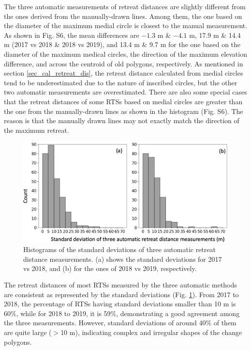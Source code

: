 \documentclass[authoryear,preprint,review,12pt]{elsarticle}
\begin{document}
The three automatic measurements of retreat distances are slightly different from the ones derived from the manually-drawn lines. Among them, the one based on the diameter of the maximum medial circle is closest to the manual measurement. 
As shown in Fig. S6, the mean differences are $-1.3$ m \& $-4.1$ m, 17.9 m \& 14.4 m (2017 vs 2018 \& 2018 vs 2019), and 13.4 m \& 9.7 m for the one based on the diameter of the maximum medical circles, the direction of the maximum elevation difference, and across the centroid of old polygons, respectively. 
As mentioned in section \ref{sec_cal_retreat_dis}, the retreat distance calculated from medial circles tend to be underestimated due to the nature of inscribed circles, but the other two automatic measurements are overestimated. 
There are also some special cases that the retreat distances of some RTSs based on medial circles are greater than the one from the manually-drawn lines as shown in the histogram (Fig. S6).
The reason is that the manually drawn lines may not exactly match the direction of the maximum retreat.  

\begin{figure} 
	\centering
	\includegraphics[width=14cm]{figs/standard_deviation_v2_trim.jpg}
	\caption{Histograms of the standard deviations of three automatic retreat distance measurements. (a) shows the standard deviations for 2017 vs 2018, and (b) for the ones of 2018 vs 2019, respectively.}
	\label{fig_re_dis_standard_var}
\end{figure}

The retreat distances of most RTSs measured by the three automatic methods are consistent as represented by the standard deviations (Fig. \ref{fig_re_dis_standard_var}).
From 2017 to 2018, the percentage of RTSs having standard deviations smaller than 10 m is 60\%, while for 2018 to 2019, it is 59\%, demonstrating a good agreement among the three measurements.
However, standard deviations of around 40\% of them are quite large ($>$10 m), indicating complex and irregular shapes of the change polygons. 
 
\end{document}

